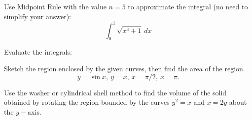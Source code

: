 \documentclass[12pt]{exam}
\begin{document}
\newpage
\begin{questions}

\question[10] Use Midpoint Rule with the value \(n=5\) to approximate the integral (no need to simplify your answer):
\[
\int_0^1 \sqrt{x^3+1}~dx
\] 
\vfill
\droptotalpoints
\newpage

\question Evaluate the integrals:
\droptotalpoints
\newpage

\question[20] Sketch the region enclosed by the given curves, then find the area of the region. \[
y= \sin x,~ y=x, ~x =\pi/2,~x=\pi.
\]
\vfill
\droptotalpoints
\newpage

\question[20] Use the washer or cylindrical shell method to find the volume of the solid obtained by rotating the region bounded by the curves $y^2=x$ and $x=2y$ about the $y-$axis. 


\end{questions}
\end{document}
